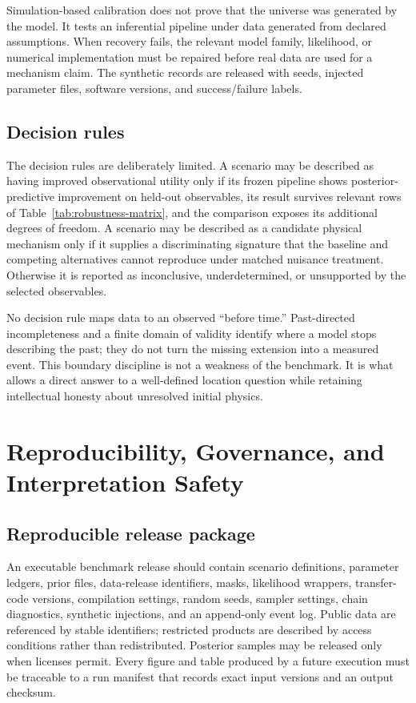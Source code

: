 \documentclass[10pt,conference]{IEEEtran}
\begin{document}
Simulation-based calibration does not prove that the universe was generated by the model. It tests an inferential pipeline under data generated from declared assumptions. When recovery fails, the relevant model family, likelihood, or numerical implementation must be repaired before real data are used for a mechanism claim. The synthetic records are released with seeds, injected parameter files, software versions, and success/failure labels.

\subsection{Decision rules}

The decision rules are deliberately limited. A scenario may be described as having improved observational utility only if its frozen pipeline shows posterior-predictive improvement on held-out observables, its result survives relevant rows of Table~\ref{tab:robustness-matrix}, and the comparison exposes its additional degrees of freedom. A scenario may be described as a candidate physical mechanism only if it supplies a discriminating signature that the baseline and competing alternatives cannot reproduce under matched nuisance treatment. Otherwise it is reported as inconclusive, underdetermined, or unsupported by the selected observables.

No decision rule maps data to an observed ``before time.'' Past-directed incompleteness and a finite domain of validity identify where a model stops describing the past; they do not turn the missing extension into a measured event. This boundary discipline is not a weakness of the benchmark. It is what allows a direct answer to a well-defined location question while retaining intellectual honesty about unresolved initial physics.

\section{Reproducibility, Governance, and Interpretation Safety}
\label{sec:reproducibility}

\subsection{Reproducible release package}

An executable benchmark release should contain scenario definitions, parameter ledgers, prior files, data-release identifiers, masks, likelihood wrappers, transfer-code versions, compilation settings, random seeds, sampler settings, chain diagnostics, synthetic injections, and an append-only event log. Public data are referenced by stable identifiers; restricted products are described by access conditions rather than redistributed. Posterior samples may be released only when licenses permit. Every figure and table produced by a future execution must be traceable to a run manifest that records exact input versions and an output checksum.
\end{document}
